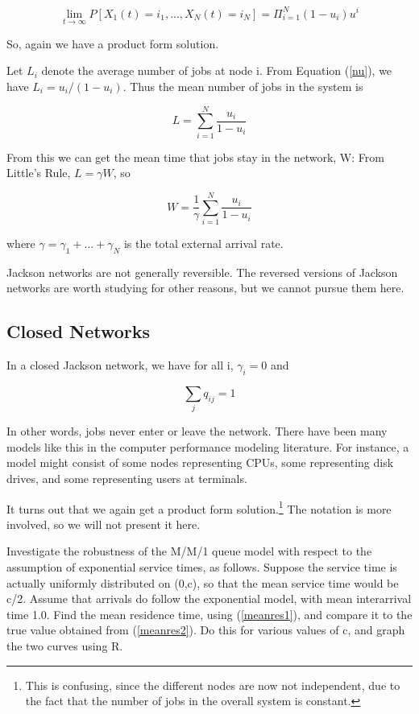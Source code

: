\begin{equation}
\lim_{t\rightarrow \infty } P[X_1(t)=i_1,...,X_N(t)=i_N] =
\Pi_{i=1}^N (1-u_i) u^i
\end{equation}  

So, again we have a product form solution.

Let $L_i$ denote the average number of jobs at node i.  From Equation
(\ref{nu}), we have $L_i = u_i/(1-u_i)$.  Thus the mean number of jobs
in the system is

\begin{equation}
L = \sum_{i=1}^N \frac{u_i}{1-u_i}
\end{equation}  

From this we can get the mean time that jobs stay in the network, W:
From Little's Rule, $L = \gamma W$, so

\begin{equation}
W = \frac{1}{\gamma} \sum_{i=1}^N \frac{u_i}{1-u_i}
\end{equation}

where $\gamma = \gamma_1 + ... + \gamma_N$ is the total external arrival
rate.

Jackson networks are not generally reversible.  The reversed versions of
Jackson networks are worth studying for other reasons, but we cannot
pursue them here.

\subsection{Closed Networks}

In a closed Jackson network, we have for all i, $\gamma_i = 0$ and 

\begin{equation}
\sum_j q_{ij} = 1
\end{equation}

In other words, jobs never enter or leave the network.  There have been
many models like this in the computer performance modeling literature.
For instance, a model might consist of some nodes representing CPUs,
some representing disk drives, and some representing users at terminals.

It turns out that we again get a product form solution.\footnote{This is
confusing, since the different nodes are now not independent, due to the
fact that the number of jobs in the overall system is constant.}  The
notation is more involved, so we will not present it here.

\startproblemset

\oneproblem Investigate the robustness of the M/M/1 queue model with
respect to the assumption of exponential service times, as follows.
Suppose the service time is actually uniformly distributed on (0,c), so
that the mean service time would be c/2.  Assume that arrivals do follow
the exponential model, with mean interarrival time 1.0.  Find the mean
residence time, using (\ref{meanres1}), and compare it to the true value
obtained from (\ref{meanres2}).  Do this for various values of c, and
graph the two curves using R.

